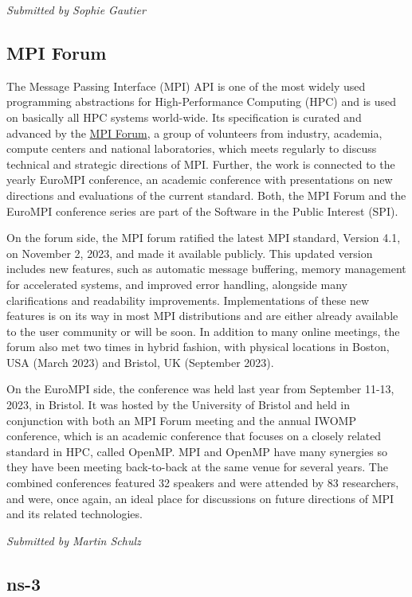 \documentclass[a4paper]{report}
\begin{document}
{\em Submitted by Sophie Gautier}

\subsection{MPI Forum}

The Message Passing Interface (MPI) API is one of the most widely used programming abstractions for High-Performance Computing (HPC) and is used on basically all HPC systems world-wide. Its specification is curated and advanced by the \href{https://www.mpi-forum.org/}{MPI Forum}, a group of volunteers from industry, academia, compute centers and national laboratories, which meets regularly to discuss technical and strategic directions of MPI. Further, the work is connected to the yearly EuroMPI conference, an academic conference with presentations on new directions and evaluations of the current standard. Both, the MPI Forum and the EuroMPI conference series are part of the Software in the Public Interest (SPI).

On the forum side, the MPI forum ratified the latest MPI standard, Version 4.1, on November 2, 2023, and made it available publicly. This updated version includes new features, such as automatic message buffering, memory management for accelerated systems, and improved error handling, alongside many clarifications and readability improvements. Implementations of these new features is on its way in most MPI distributions and are either already available to the user community or will be soon. In addition to many online meetings, the forum also met two times in hybrid fashion, with physical locations in Boston, USA (March 2023) and Bristol, UK (September 2023).

On the EuroMPI side, the conference was held last year from September 11-13, 2023, in Bristol. It was hosted by the University of Bristol and held in conjunction with both an MPI Forum meeting and the annual IWOMP conference, which is an academic conference that focuses on a closely related standard in HPC, called OpenMP. MPI and OpenMP have many synergies so they have been meeting back-to-back at the same venue for several years. The combined conferences featured 32 speakers and were attended by 83 researchers, and were, once again, an ideal place for discussions on future directions of MPI and its related technologies.

{\em Submitted by Martin Schulz}

\subsection{ns-3}
\end{document}
